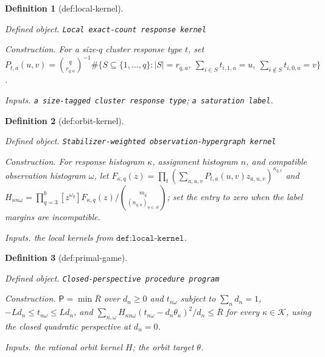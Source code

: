 \documentclass{article}
\newtheorem{definition}{Definition}
\begin{document}
\begin{definition}[def:local-kernel]\label{def:local-kernel}
\par\smallskip\noindent\emph{Defined object.} \texttt{Local exact-\allowbreak{}count response kernel}
\par\smallskip\noindent\emph{Construction.} For a size-\(q\) cluster response type \(t\), set \(P_{t,a}(u,v)=\binom{q}{r_{q,a}}^{-1}\#\{S\subseteq\{1,\ldots,q\}:|S|=r_{q,a},\ \sum_{i\in S}t_{i,1,a}=u,\ \sum_{i\notin S}t_{i,0,a}=v\}\).
\par\smallskip\noindent\emph{Inputs.} \texttt{a size-\allowbreak{}tagged cluster response type}; \texttt{a saturation label}.
\end{definition}

\begin{definition}[def:orbit-kernel]\label{def:orbit-kernel}
\par\smallskip\noindent\emph{Defined object.} \texttt{Stabilizer-\allowbreak{}weighted observation-\allowbreak{}hypergraph kernel}
\par\smallskip\noindent\emph{Construction.} For response histogram \(\kappa\), assignment histogram \(n\), and compatible observation histogram \(\omega\), let \(F_{\kappa,q}(z)=\prod_t(\sum_{a,u,v}P_{t,a}(u,v)z_{a,u,v})^{\kappa_{q,t}}\) and \(H_{\kappa n\omega}=\prod_{q=3}^{b}[z^{\omega_q}]F_{\kappa,q}(z)/\binom{m_q}{(n_{q,a})_{a\in\mathcal A}}\); set the entry to zero when the label margins are incompatible.
\par\smallskip\noindent\emph{Inputs.} the local kernels from \(\texttt{def:local-kernel}\).
\end{definition}

\begin{definition}[def:primal-game]\label{def:primal-game}
\par\smallskip\noindent\emph{Defined object.} \texttt{Closed-\allowbreak{}perspective procedure program}
\par\smallskip\noindent\emph{Construction.} \(\mathsf P=\min \overline R\) over \(d_n\ge0\) and \(t_{n\omega}\) subject to \(\sum_nd_n=1\), \(-Ld_n\le t_{n\omega}\le Ld_n\), and \(\sum_{n,\omega}H_{\kappa n\omega}(t_{n\omega}-d_n\theta_\kappa)^2/d_n\le \overline R\) for every \(\kappa\in\mathcal K\), using the closed quadratic perspective at \(d_n=0\).
\par\smallskip\noindent\emph{Inputs.} the rational orbit kernel \(H\); the orbit target \(\theta\).
\end{definition}
\end{document}
